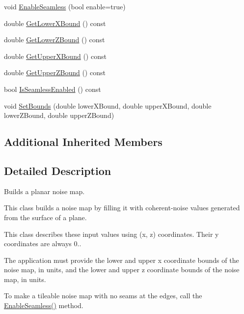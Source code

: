 \begin{DoxyCompactItemize}
\item 
void \hyperlink{classnoise_1_1utils_1_1_noise_map_builder_plane_aaeb5753c662ab9357ac124e06be31b22}{Enable\+Seamless} (bool enable=true)
\item 
double \hyperlink{classnoise_1_1utils_1_1_noise_map_builder_plane_a7fcdf629f25bf97dc105bd218e04e2f7}{Get\+Lower\+X\+Bound} () const 
\item 
double \hyperlink{classnoise_1_1utils_1_1_noise_map_builder_plane_accdd95d5332d919e2420ec0b6b74de3c}{Get\+Lower\+Z\+Bound} () const 
\item 
double \hyperlink{classnoise_1_1utils_1_1_noise_map_builder_plane_a676f8ad0d645990b95faa18052afd380}{Get\+Upper\+X\+Bound} () const 
\item 
double \hyperlink{classnoise_1_1utils_1_1_noise_map_builder_plane_a57893a6512748aec267e9c186d30f925}{Get\+Upper\+Z\+Bound} () const 
\item 
bool \hyperlink{classnoise_1_1utils_1_1_noise_map_builder_plane_a2ed067659249fa28e4220166cb221ce7}{Is\+Seamless\+Enabled} () const 
\item 
void \hyperlink{classnoise_1_1utils_1_1_noise_map_builder_plane_a64bae7af3e301fafe7fe887b26029d98}{Set\+Bounds} (double lower\+X\+Bound, double upper\+X\+Bound, double lower\+Z\+Bound, double upper\+Z\+Bound)
\end{DoxyCompactItemize}
\subsection*{Additional Inherited Members}


\subsection{Detailed Description}
Builds a planar noise map.

This class builds a noise map by filling it with coherent-\/noise values generated from the surface of a plane.

This class describes these input values using (x, z) coordinates. Their y coordinates are always 0..

The application must provide the lower and upper x coordinate bounds of the noise map, in units, and the lower and upper z coordinate bounds of the noise map, in units.

To make a tileable noise map with no seams at the edges, call the \hyperlink{classnoise_1_1utils_1_1_noise_map_builder_plane_aaeb5753c662ab9357ac124e06be31b22}{Enable\+Seamless()} method. 

